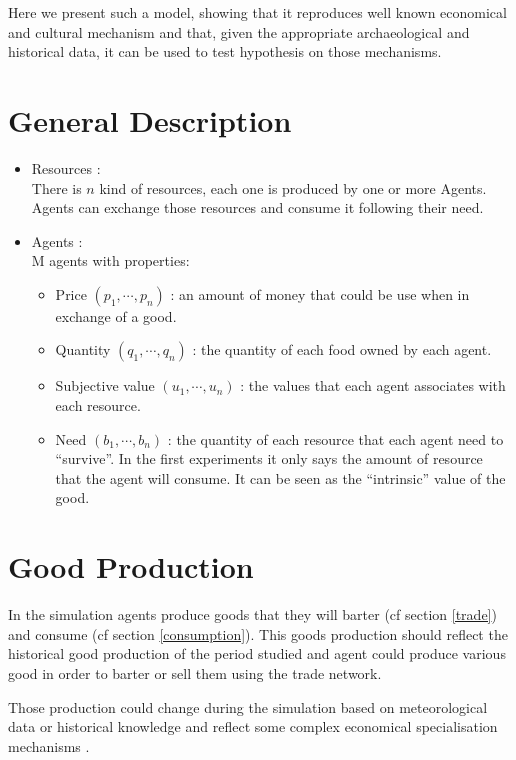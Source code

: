 \documentclass{wscpaperproc}
\begin{document}
Here we present such a model, showing that it reproduces well known economical and cultural mechanism and that, given the appropriate archaeological and historical data, it can be used to test hypothesis on those mechanisms.

\section{General Description} 
\begin{itemize}
	\item Resources :\\
		There is $n$ kind of resources, each one is produced by one or more Agents. Agents can exchange those resources and consume it following their need.
	\item  Agents :\\
		M agents with properties:
		\begin{itemize}
			\item Price $(p_1,\cdots,p_n)$ : an amount of money that could be use when in exchange of a good.
			\item Quantity $(q_1,\cdots,q_n)$ : the quantity of each food owned by each agent.
			\item Subjective value $(u_1,\cdots,u_n)$ : the values that each agent associates with each resource.
			\item Need $(b_1, \cdots, b_n)$ :  the quantity of each resource that each agent need to ``survive''. In the first experiments it only says the amount of resource that the agent will consume. It can be seen as the ``intrinsic'' value of the good.
		\end{itemize}
\end{itemize}
\section{Good Production}
\label{production}


In the simulation agents produce goods that they will barter (cf section \ref{trade}) and consume (cf section \ref{consumption}). This goods production should reflect the historical good production of the period studied and agent could produce various good in order to barter or sell them using the trade network.

Those production could change during the simulation based on meteorological data or historical knowledge and reflect some complex economical specialisation mechanisms \cite{bentley_specialisation_2005}.
\end{document}
